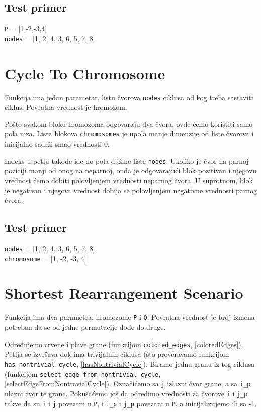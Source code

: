 

\subsection{Test primer}

\noindent\texttt{P} = [1,-2,-3,4]
\\\texttt{nodes} = [1, 2, 4, 3, 6, 5, 7, 8]

\section{Cycle To Chromosome}
\label{cycleToChrom}

Funkcija ima jedan parametar, listu čvorova \texttt{nodes} ciklusa od kog treba sastaviti ciklus. Povratna vrednost je hromozom.

Pošto svakom bloku hromozoma odgovaraju dva čvora, ovde ćemo koristiti samo pola niza. Lista blokova \texttt{chromosomes} je upola manje dimenzije od liste čvorova i inicijalno sadrži smao vrednosti 0.

Indeks u petlji takođe ide do pola dužine liste \texttt{nodes}. Ukoliko je čvor na parnoj poziciji manji od onog na neparnoj, onda je odgovarajući blok pozitivan i njegovu vrednost ćemo dobiti polovljenjem vrednosti neparnog čvora. U suprotnom, blok je negativan i njegova vrednost dobija se polovljenjem negativne vrednosti parnog čvora.



\subsection{Test primer}

\noindent\texttt{nodes} = [1, 2, 4, 3, 6, 5, 7, 8]
\\\texttt{chromosome} = [1, -2, -3, 4]


\section{Shortest Rearrangement Scenario}

Funkcija ima dva parametra, hromozome \texttt{P} i \texttt{Q}. Povratna vrednost je broj izmena potreban da se od jedne permutacije dođe do druge.

Određujemo crvene i plave grane (funkcijom \texttt{colored\_edges}, \ref{coloredEdges}). Petlja se izvršava dok ima trivijalnih ciklusa (što proveravamo funkcijom \texttt{has\_nontrivial\_cycle}, \ref{hasNontrivialCycle}). Biramo jednu granu iz tog ciklusa (funkcijom \texttt{select\_edge\_from\_nontrivial\_cycle}, \ref{selectEdgeFromNontravialCycle}). Označićemo sa \texttt{j} izlazni čvor grane, a sa \texttt{i\_p} ulazni čvor te grane. Pokušaćemo još da odredimo vrednosti za čvorove \texttt{i} i \texttt{j\_p} takve da su \texttt{i} i \texttt{j} povezani u \texttt{P}, i \texttt{i\_p} i \texttt{j\_p} povezani u \texttt{P}, a inicijalizujemo ih sa -1.

